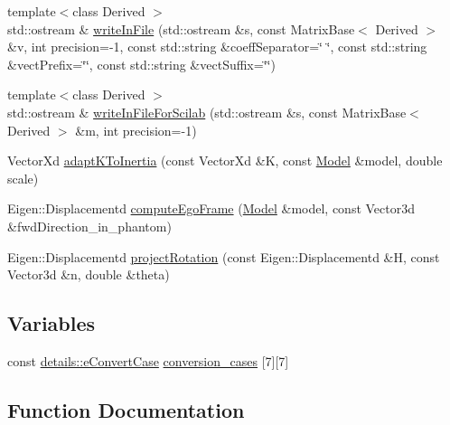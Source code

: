 \begin{DoxyCompactItemize}
\item 
{\footnotesize template$<$class Derived $>$ }\\std\+::ostream \& \hyperlink{namespaceocra_1_1utils_af94bc08a67cf20092611bb37f4528b28}{write\+In\+File} (std\+::ostream \&s, const Matrix\+Base$<$ Derived $>$ \&v, int precision=-\/1, const std\+::string \&coeff\+Separator=\char`\"{} \char`\"{}, const std\+::string \&vect\+Prefix=\char`\"{}\char`\"{}, const std\+::string \&vect\+Suffix=\char`\"{}\char`\"{})
\item 
{\footnotesize template$<$class Derived $>$ }\\std\+::ostream \& \hyperlink{namespaceocra_1_1utils_a11933c4ad5ae5b9bdce3005941bdd433}{write\+In\+File\+For\+Scilab} (std\+::ostream \&s, const Matrix\+Base$<$ Derived $>$ \&m, int precision=-\/1)
\item 
Vector\+Xd \hyperlink{namespaceocra_1_1utils_acfdf52324cf9c44fbe5225d17d5ff926}{adapt\+K\+To\+Inertia} (const Vector\+Xd \&K, const \hyperlink{classocra_1_1Model}{Model} \&model, double scale)
\item 
Eigen\+::\+Displacementd \hyperlink{namespaceocra_1_1utils_aaad3b464589711bcc5fecec8c8b9af76}{compute\+Ego\+Frame} (\hyperlink{classocra_1_1Model}{Model} \&model, const Vector3d \&fwd\+Direction\+\_\+in\+\_\+phantom)
\item 
Eigen\+::\+Displacementd \hyperlink{namespaceocra_1_1utils_a07cf93b22e02458b2c184ddd5787a6b2}{project\+Rotation} (const Eigen\+::\+Displacementd \&H, const Vector3d \&n, double \&theta)
\end{DoxyCompactItemize}
\subsection*{Variables}
\begin{DoxyCompactItemize}
\item 
const \hyperlink{namespaceocra_1_1utils_1_1details_a617d399055aa54cfdf2d3199ca91c399}{details\+::e\+Convert\+Case} \hyperlink{namespaceocra_1_1utils_a4775079ee4f9f6c7620af882e8092c62}{conversion\+\_\+cases} \mbox{[}7\mbox{]}\mbox{[}7\mbox{]}
\end{DoxyCompactItemize}


\subsection{Function Documentation}

